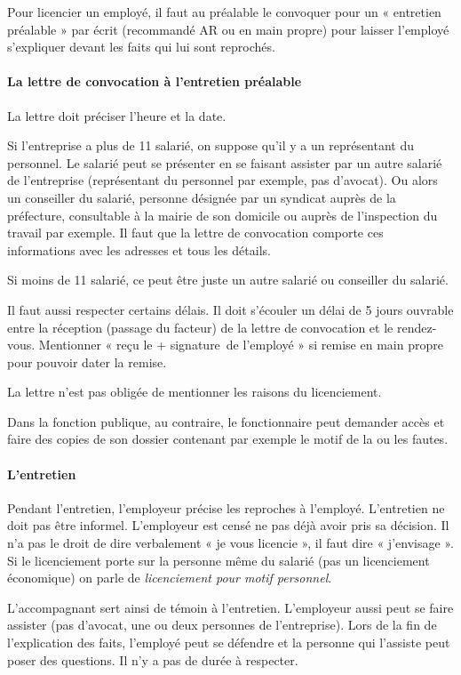 Pour licencier un employé, il faut au préalable le convoquer pour un « entretien préalable » par écrit (recommandé AR ou en main propre) pour laisser l’employé s’expliquer devant les faits qui lui sont reprochés.

\paragraph{La lettre de convocation à l'entretien préalable}

La lettre doit préciser l’heure et la date.

Si l’entreprise a plus de 11 salarié, on suppose qu’il y a un représentant du personnel.
Le salarié peut se présenter en se faisant assister par un autre salarié de l’entreprise (représentant du personnel par exemple, pas d’avocat).
Ou alors un conseiller du salarié, personne désignée par un syndicat auprès de la préfecture, consultable à la mairie de son domicile ou auprès de l’inspection du travail par exemple.
Il faut que la lettre de convocation comporte ces informations avec les adresses et tous les détails.

Si moins de 11 salarié, ce peut être juste un autre salarié ou conseiller du salarié.

Il faut aussi respecter certains délais.
Il doit s’écouler un délai de 5 jours ouvrable entre la réception (passage du facteur) de la lettre de convocation et le rendez-vous.
Mentionner « reçu le + signature de l’employé » si remise en main propre pour pouvoir dater la remise.

La lettre n’est pas obligée de mentionner les raisons du licenciement.

Dans la fonction publique, au contraire, le fonctionnaire peut demander accès et faire des copies de son dossier contenant par exemple le motif de la ou les fautes.


\paragraph{L'entretien}

Pendant l’entretien, l’employeur précise les reproches à l’employé.
L'entretien ne doit pas être informel.
L’employeur est censé ne pas déjà avoir pris sa décision.
Il n’a pas le droit de dire verbalement « je vous licencie », il faut dire « j’envisage ».
Si le licenciement porte sur la personne même du salarié (pas un licenciement économique) on parle de \textit{licenciement pour motif personnel}.

L’accompagnant sert ainsi de témoin à l’entretien.
L’employeur aussi peut se faire assister (pas d’avocat, une ou deux personnes de l'entreprise).
Lors de la fin de l’explication des faits, l’employé peut se défendre et la personne qui l'assiste peut poser des questions.
Il n'y a pas de durée à respecter.

